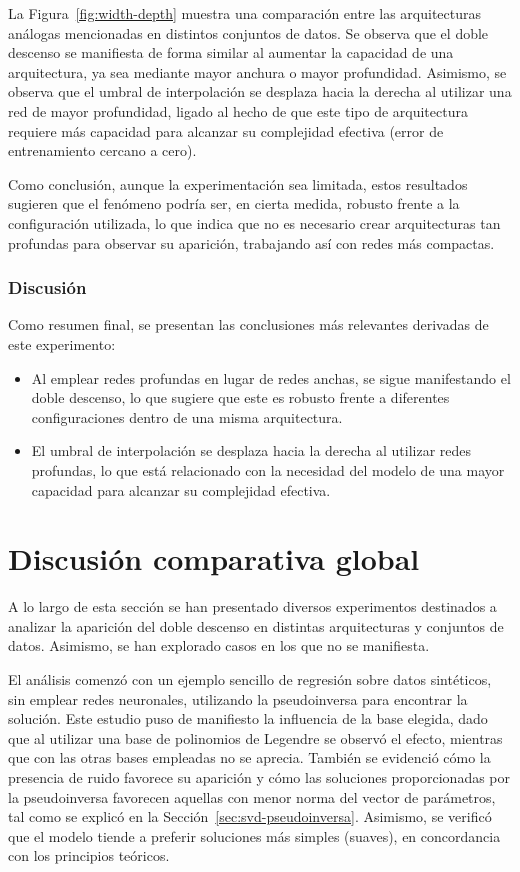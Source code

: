 La Figura~\ref{fig:width-depth} muestra una comparación entre las arquitecturas análogas mencionadas en distintos conjuntos de datos. Se observa que el doble descenso se manifiesta de forma similar al aumentar la capacidad de una arquitectura, ya sea mediante mayor anchura o mayor profundidad. Asimismo, se observa que el umbral de interpolación se desplaza hacia la derecha al utilizar una red de mayor profundidad, ligado al hecho de que este tipo de arquitectura requiere más capacidad para alcanzar su complejidad efectiva (error de entrenamiento cercano a cero).

Como conclusión, aunque la experimentación sea limitada, estos resultados sugieren que el fenómeno podría ser, en cierta medida, robusto frente a la configuración utilizada, lo que indica que no es necesario crear arquitecturas tan profundas para observar su aparición, trabajando así con redes más compactas.

\subsubsection{Discusión}\label{subsubsec:discusion-width-depth}

Como resumen final, se presentan las conclusiones más relevantes derivadas de este experimento:

\begin{itemize}
    \item Al emplear redes profundas en lugar de redes anchas, se sigue manifestando el doble descenso, lo que sugiere que este es robusto frente a diferentes configuraciones dentro de una misma arquitectura.
    \item El umbral de interpolación se desplaza hacia la derecha al utilizar redes profundas, lo que está relacionado con la necesidad del modelo de una mayor capacidad para alcanzar su complejidad efectiva.
\end{itemize}

\section{Discusión comparativa global}\label{sec:conclusion-informatica}

A lo largo de esta sección se han presentado diversos experimentos destinados a analizar la aparición del doble descenso en distintas arquitecturas y conjuntos de datos. Asimismo, se han explorado casos en los que no se manifiesta.

El análisis comenzó con un ejemplo sencillo de regresión sobre datos sintéticos, sin emplear redes neuronales, utilizando la pseudoinversa para encontrar la solución. Este estudio puso de manifiesto la influencia de la base elegida, dado que al utilizar una base de polinomios de Legendre se observó el efecto, mientras que con las otras bases empleadas no se aprecia. También se evidenció cómo la presencia de ruido favorece su aparición y cómo las soluciones proporcionadas por la pseudoinversa favorecen aquellas con menor norma del vector de parámetros, tal como se explicó en la Sección~\ref{sec:svd-pseudoinversa}. Asimismo, se verificó que el modelo tiende a preferir soluciones más simples (suaves), en concordancia con los principios teóricos.

